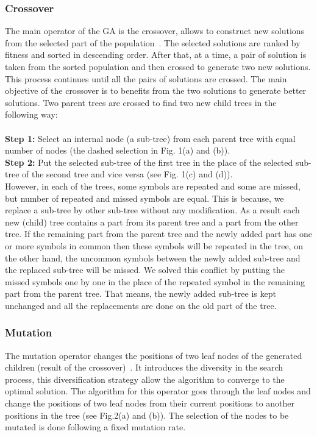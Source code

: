 \documentclass[preprint,12pt]{elsarticle}
\begin{document}
\subsubsection{Crossover}
The main operator of the GA is the crossover, allows to construct new solutions from the selected part of the population~\cite{osa14}. The selected solutions are ranked by fitness and sorted in descending order. After that, at a time, a pair of solution is taken from the sorted population and then crossed to generate two new solutions. This process continues until all the pairs of solutions are crossed. The main objective of the crossover is to benefits from the two solutions  to generate better solutions.
Two parent trees are crossed to find two new child trees in the following way:\\\\
\textbf{Step 1: }Select an internal node (a sub-tree) from each parent tree with equal number of nodes (the dashed selection in Fig. 1(a) and (b)). \\
\textbf{Step 2:} Put the selected sub-tree of the first tree in the place of the selected sub-tree of the second tree and vice versa (see Fig. 1(c) and (d)).\\

However, in each of the trees, some symbols are repeated and some are missed, but number of repeated and missed symbols are equal. This is because, we replace a sub-tree by other sub-tree without any modification. As a result each new (child) tree contains a part from its parent tree and a part from the other tree. If the remaining part from the parent tree and the newly added part has one or more  symbols in common then these symbols will be repeated in the tree, on the other hand, the uncommon symbols between the newly added sub-tree and  the replaced sub-tree will be missed.  We solved this conflict by putting the missed symbols one by one in the place of the repeated symbol in the remaining part from the parent tree. That means, the newly added sub-tree is kept unchanged and all the replacements are done on the old part of the tree.

\subsubsection{Mutation}
The mutation operator changes the positions of two leaf nodes of the generated children (result of the crossover)~\cite{muhlenbein1992genetic}. It introduces the diversity in the search process, this diversification strategy allow the algorithm to converge to the optimal solution. The algorithm for this operator goes through the leaf nodes and change the positions of two leaf nodes from their current positions to another positions in the tree (see Fig.2(a) and (b)). The selection of the nodes to be mutated is done following a fixed mutation rate.
\end{document}
